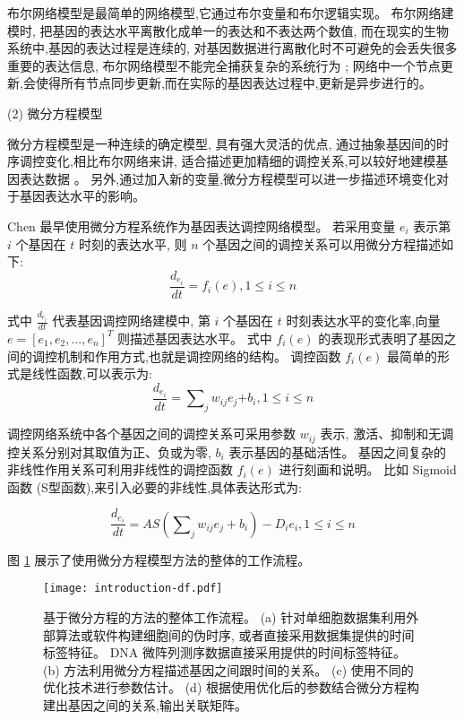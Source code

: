 布尔网络模型是最简单的网络模型,它通过布尔变量和布尔逻辑实现。
布尔网络建模时, 把基因的表达水平离散化成单一的表达和不表达两个数值,
而在现实的生物系统中,基因的表达过程是连续的,
对基因数据进行离散化时不可避免的会丢失很多重要的表达信息,
布尔网络模型不能完全捕获复杂的系统行为 \cite{lee2009computational};
网络中一个节点更新,会使得所有节点同步更新,而在实际的基因表达过程中,更新是异步进行的。

(2) 微分方程模型

微分方程模型是一种连续的确定模型, 具有强大灵活的优点,
通过抽象基因间的时序调控变化,相比布尔网络来讲, 适合描述更加精细的调控关系,可以较好地建模基因表达数据 \cite{gardner2003inferring,di2005chemogenomic,bansal2006inference, honkela2010model,lu2011high,li2011large}。
另外,通过加入新的变量,微分方程模型可以进一步描述环境变化对于基因表达水平的影响。

Chen \cite{chen1999modeling} 最早使用微分方程系统作为基因表达调控网络模型。
若采用变量 $e_i$ 表示第 $i$ 个基因在 $t$ 时刻的表达水平, 则 $n$ 个基因之间的调控关系可以用微分方程描述如下:
\begin{equation}
\frac{{d_{e_i}}}{{dt}} = f_i (e),1 \le i \le n
\end{equation}

式中 $\frac{{d_{e_i }}}{{dt}}$ 代表基因调控网络建模中,
第 $i$ 个基因在 $t$ 时刻表达水平的变化率,向量 $e=[e_1,e_2,...,e_n]^T$ 则描述基因表达水平。
式中 $f_i(e)$ 的表现形式表明了基因之间的调控机制和作用方式,也就是调控网络的结构。
调控函数 $f_i(e)$ 最简单的形式是线性函数,可以表示为:
\begin{equation}
\frac{{d_{e_i }}}{{dt}} = \sum\nolimits_j {w_{ij} e_j} { + b_i } ,1 \le i \le n
\end{equation}

调控网络系统中各个基因之间的调控关系可采用参数 $w_{ij}$ 表示,
激活、抑制和无调控关系分别对其取值为正、负或为零, $b_i$ 表示基因的基础活性。
基因之间复杂的非线性作用关系可利用非线性的调控函数 $f_i(e)$ 进行刻画和说明。
比如 Sigmoid 函数 (S型函数),来引入必要的非线性,具体表达形式为:

\begin{equation}
\frac{{d_{e_i } }}{{dt}} = AS(\sum\nolimits_j {w_{ij} e_j } + b_i) - D_i e_i ,1 \le i \le n
\end{equation}

图 \ref{fig:pre-df} 展示了使用微分方程模型方法的整体的工作流程。
\begin{figure}[!htbp]
    \centering
    \texttt{[image: introduction-df.pdf]}
    \caption{
        基于微分方程的方法的整体工作流程。
        (a) 针对单细胞数据集利用外部算法或软件构建细胞间的伪时序, 或者直接采用数据集提供的时间标签特征。
         DNA 微阵列测序数据直接采用提供的时间标签特征。
        (b) 方法利用微分方程描述基因之间跟时间的关系。
        (c) 使用不同的优化技术进行参数估计。
        (d) 根据使用优化后的参数结合微分方程构建出基因之间的关系,输出关联矩阵。
    }
    \label{fig:pre-df}
\end{figure}

